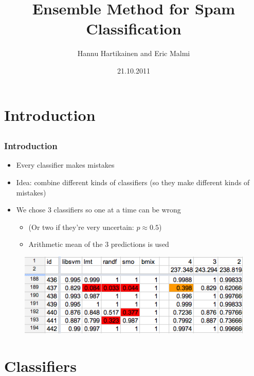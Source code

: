 \documentclass{beamer}
\title{Ensemble Method for Spam Classification}
\author{Hannu Hartikainen and Eric Malmi}
\date{21.10.2011}
\begin{document}
\setlength{\unitlength}{\textwidth}

\frame{\titlepage}

\section{Introduction}
\subsection{}

\frame
{
  \frametitle{Introduction}

  \begin{itemize}
    \item Every classifier makes mistakes
    \item Idea: combine different kinds of classifiers (so they make different kinds of mistakes)
    \item We chose 3 classifiers so one at a time can be wrong
    \begin{itemize}
        \item (Or two if they're very uncertain: $p \approx 0.5$)
        \item Arithmetic mean of the 3 predictions is used
    \end{itemize}
  \end{itemize}

\begin{figure}
	\centering
	\includegraphics[width=\textwidth]{spreadsheet.png}
\end{figure}
}


\section{Classifiers}
\end{document}
